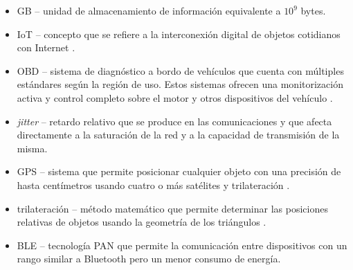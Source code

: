 \begin{acronym}
\end{acronym}

\begin{itemize}
  \item \ac{GB} -- unidad de almacenamiento de información equivalente a $10^9$ bytes.
  \item \ac{IoT} -- concepto que se refiere a la interconexión digital de objetos 
        cotidianos con Internet \cite{InternetCosas2021}.
  \item \ac{OBD} -- sistema de diagnóstico a bordo de vehículos que
        cuenta con múltiples estándares según la región de uso. Estos
        sistemas ofrecen una monitorización activa y control completo
        sobre el motor y otros dispositivos del vehículo \cite{OBD2021}.
  \item \textit{jitter} -- retardo relativo que se produce en las comunicaciones
        y que afecta directamente a la saturación de la red y a la capacidad de
        transmisión de la misma.
  \item \ac{GPS} -- sistema que permite posicionar cualquier objeto con una 
        precisión de hasta centímetros usando cuatro o más satélites y 
        trilateración \cite{GPS2021}.
  \item trilateración -- método matemático que permite determinar las posiciones
        relativas de objetos usando la geometría de los triángulos \cite{Trilateracion2021}.
  \item \ac{BLE} -- tecnología \ac{PAN} que permite la comunicación entre dispositivos
        con un rango similar a Bluetooth pero un menor consumo de energía.
\end{itemize}